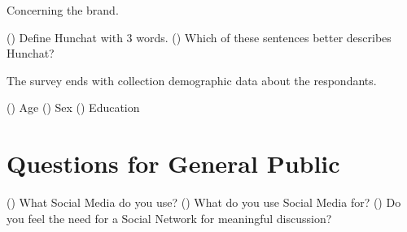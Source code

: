 \documentclass[11pt]{article}
\begin{document}
Concerning the brand.\par
() Define Hunchat with 3 words.
() Which of these sentences better describes Hunchat?

The survey ends with collection demographic data about the respondants.\par
() Age
() Sex
() Education

\section{Questions for General Public}\label{qtarget}

() What Social Media do you use?
() What do you use Social Media for?
() Do you feel the need for a Social Network for meaningful discussion?


\end{document}
